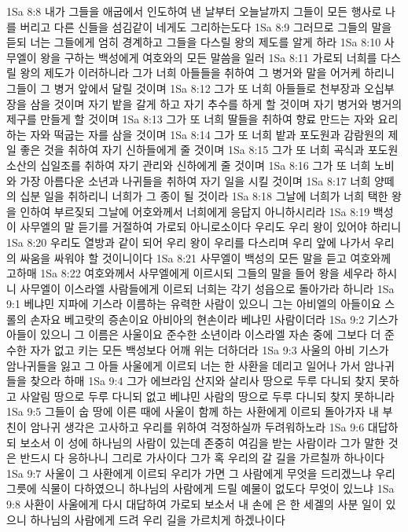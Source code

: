 1Sa 8:8  내가 그들을 애굽에서 인도하여 낸 날부터 오늘날까지 그들이 모든 행사로 나를 버리고 다른 신들을 섬김같이 네게도 그리하는도다
1Sa 8:9  그러므로 그들의 말을 듣되 너는 그들에게 엄히 경계하고 그들을 다스릴 왕의 제도를 알게 하라
1Sa 8:10  사무엘이 왕을 구하는 백성에게 여호와의 모든 말씀을 일러
1Sa 8:11  가로되 너희를 다스릴 왕의 제도가 이러하니라 그가 너희 아들들을 취하여 그 병거와 말을 어거케 하리니 그들이 그 병거 앞에서 달릴 것이며
1Sa 8:12  그가 또 너희 아들들로 천부장과 오십부장을 삼을 것이며 자기 밭을 갈게 하고 자기 추수를 하게 할 것이며 자기 병거와 병거의 제구를 만들게 할 것이며
1Sa 8:13  그가 또 너희 딸들을 취하여 향료 만드는 자와 요리하는 자와 떡굽는 자를 삼을 것이며
1Sa 8:14  그가 또 너희 밭과 포도원과 감람원의 제일 좋은 것을 취하여 자기 신하들에게 줄 것이며
1Sa 8:15  그가 또 너희 곡식과 포도원 소산의 십일조를 취하여 자기 관리와 신하에게 줄 것이며
1Sa 8:16  그가 또 너희 노비와 가장 아름다운 소년과 나귀들을 취하여 자기 일을 시킬 것이며
1Sa 8:17  너희 양떼의 십분 일을 취하리니 너희가 그 종이 될 것이라
1Sa 8:18  그날에 너희가 너희 택한 왕을 인하여 부르짖되 그날에 어호와께서 너희에게 응답지 아니하시리라
1Sa 8:19  백성이 사무엘의 말 듣기를 거절하여 가로되 아니로소이다 우리도 우리 왕이 있어야 하리니
1Sa 8:20  우리도 열방과 같이 되어 우리 왕이 우리를 다스리며 우리 앞에 나가서 우리의 싸움을 싸워야 할 것이니이다
1Sa 8:21  사무엘이 백성의 모든 말을 듣고 여호와께 고하매
1Sa 8:22  여호와께서 사무엘에게 이르시되 그들의 말을 들어 왕을 세우라 하시니 사무엘이 이스라엘 사람들에게 이르되 너희는 각기 성읍으로 돌아가라 하니라
1Sa 9:1  베냐민 지파에 기스라 이름하는 유력한 사람이 있으니 그는 아비엘의 아들이요 스롤의 손자요 베고랏의 증손이요 아비아의 현손이라 베냐민 사람이더라
1Sa 9:2  기스가 아들이 있으니 그 이름은 사울이요 준수한 소년이라 이스라엘 자손 중에 그보다 더 준수한 자가 없고 키는 모든 백성보다 어깨 위는 더하더라
1Sa 9:3  사울의 아비 기스가 암나귀들을 잃고 그 아들 사울에게 이르되 너는 한 사환을 데리고 일어나 가서 암나귀들을 찾으라 하매
1Sa 9:4  그가 에브라임 산지와 살리사 땅으로 두루 다니되 찾지 못하고 사알림 땅으로 두루 다니되 없고 베냐민 사람의 땅으로 두루 다니되 찾지 못하니라
1Sa 9:5  그들이 숩 땅에 이른 때에 사울이 함께 하는 사환에게 이르되 돌아가자 내 부친이 암나귀 생각은 고사하고 우리를 위하여 걱정하실까 두려워하노라
1Sa 9:6  대답하되 보소서 이 성에 하나님의 사람이 있는데 존중히 여김을 받는 사람이라 그가 말한 것은 반드시 다 응하나니 그리로 가사이다 그가 혹 우리의 갈 길을 가르칠까 하나이다
1Sa 9:7  사울이 그 사환에게 이르되 우리가 가면 그 사람에게 무엇을 드리겠느냐 우리 그릇에 식물이 다하였으니 하나님의 사람에게 드릴 예물이 없도다 무엇이 있느냐
1Sa 9:8  사환이 사울에게 다시 대답하여 가로되 보소서 내 손에 은 한 세겔의 사분 일이 있으니 하나님의 사람에게 드려 우리 길을 가르치게 하겠나이다
